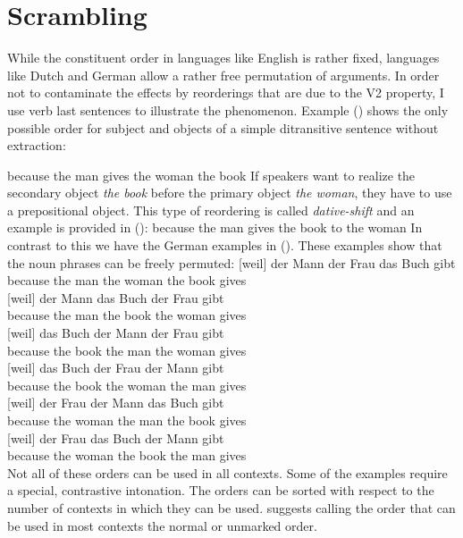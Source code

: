 \section{Scrambling}

While the constituent order in languages like English is rather fixed, languages like Dutch and
German allow a rather free permutation of arguments. In order not to contaminate the effects by
reorderings that are due to the V2 property, I use verb last sentences to illustrate the
phenomenon. Example () shows the only possible order for subject and objects of a simple
ditransitive sentence without extraction:


\ea
because the man gives the woman the book 
\z
If speakers want to realize the secondary object \emph{the book} before the primary object \emph{the
  woman}, they have to use a prepositional object. This type of reordering is called
\emph{dative-shift} and an example is provided in ():
\ea
because the man gives the book to the woman 
\z
In contrast to this we have the German examples in (). These examples show that the noun
phrases can be freely permuted:
\eal
\ex 
\gll {}[weil]          der Mann der Frau das Buch gibt\\
     \spacebr{}because the man the woman the book gives\\
\ex 
\gll {}[weil]          der Mann das Buch der Frau  gibt\\
     \spacebr{}because the man  the book the woman gives\\
\ex 
\gll {}[weil]          das Buch der Mann der Frau  gibt\\
     \spacebr{}because the book the man  the woman gives\\
\ex 
\gll {}[weil]          das Buch der Frau  der Mann gibt\\
     \spacebr{}because the book the woman the man  gives\\
\ex 
\gll {}[weil]          der Frau  der Mann das Buch gibt\\
     \spacebr{}because the woman the man  the book gives\\
\ex 
\gll {}[weil]          der Frau  das Buch der Mann gibt\\
     \spacebr{}because the woman the book the man  gives\\
\zl
Not all of these orders can be used in all contexts. Some of the examples require a special,
contrastive intonation. The orders can be sorted with respect to the number of contexts in which
they can be used. \citet{Hoehle82a} suggests calling the order that can be used in most contexts the
normal or unmarked order.




